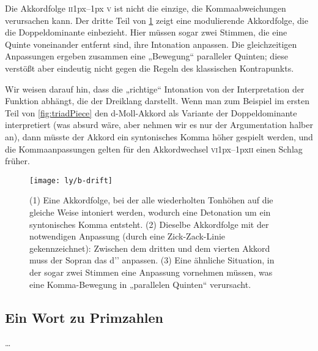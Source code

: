 Die Akkordfolge \textsc{ii}\kern1px–\kern1px \textsc{v} ist nicht die einzige,
die Kommaabweichungen verursachen kann. Der dritte Teil von \cref{fig:drift}
zeigt eine modulierende Akkordfolge, die die Doppeldominante einbezieht. Hier
müssen sogar zwei Stimmen, die eine Quinte voneinander entfernt sind, ihre
Intonation anpassen. Die gleichzeitigen Anpassungen ergeben zusammen eine
„Bewegung“ paralleler Quinten; diese verstößt aber eindeutig nicht gegen die
Regeln des klassischen Kontrapunkts.

Wir weisen darauf hin, dass die „richtige“ Intonation von der Interpretation der
Funktion abhängt, die der Dreiklang darstellt. Wenn man zum Beispiel im ersten
Teil von \cref{fig:triadPiece} den d-Moll-Akkord als Variante der
Doppeldominante interpretiert (was absurd wäre, aber nehmen wir es
nur der Argumentation halber an), dann müsste der Akkord ein syntonisches Komma
höher gespielt werden, und die Kommaanpassungen gelten für den Akkordwechsel
\textsc{vi}\kern1px–\kern1px\textsc{ii} einen Schlag früher.

\begin{figure}
  \centering
  \texttt{[image: ly/b-drift]}
  \caption{(1) Eine Akkordfolge, bei der alle wiederholten Tonhöhen auf die   
  	gleiche Weise intoniert werden, wodurch eine Detonation um ein syntonisches
  	Komma entsteht.%
  	\quad(2) Dieselbe Akkordfolge mit der notwendigen Anpassung (durch eine
  	Zick-Zack-Linie gekennzeichnet): Zwischen dem dritten und dem vierten Akkord
  	muss der Sopran das d’’ anpassen.%
  	\quad(3) Eine ähnliche Situation, in der sogar zwei Stimmen eine Anpassung
  	vornehmen müssen, was eine Komma-Bewegung in „parallelen Quinten“
  	verursacht.}\label{fig:drift}
\end{figure}

\subsection{Ein Wort zu Primzahlen}

…

